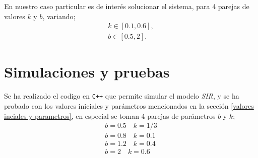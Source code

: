 \documentclass[journal]{IEEEtran}
\begin{document}
En nuestro caso particular es de interés solucionar el sistema, para 4 parejas de valores $k$ y $b$, variando;
\begin{equation}
	\begin{split}
		k \in [0.1, 0.6],\\
		b \in [0.5, 2].
	\end{split}
\end{equation}


\section{Simulaciones y pruebas}\label{simulaciones}

Se ha realizado el codigo en \texttt{C++} que permite simular el modelo \textit{SIR}, y se ha probado
con los valores iniciales y parámetros mencionados en la sección \ref{valores inciales y parametros}, 
en especial se toman 4 parejas de parámetros $b$ y $k$;
\begin{equation}\label{parametros}
	\begin{split}
		b= 0.5  \quad k = 1/3\\
		b= 0.8 \quad k = 0.1\\
		b= 1.2 \quad k = 0.4\\
		b= 2 \quad k = 0.6\\
	\end{split}
\end{equation}
\end{document}
